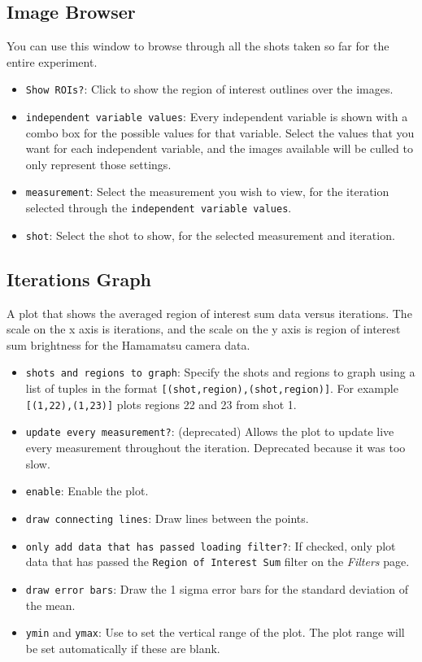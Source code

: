 \documentclass[pdftex,11pt,letterpaper]{article}
\begin{document}
\subsection{Image Browser}

You can use this window to browse through all the shots taken so far for the entire experiment.

\begin{itemize}
\item \texttt{Show ROIs?}: Click to show the region of interest outlines over the images.
\item \texttt{independent variable values}:  Every independent variable is shown with a combo box for the possible values for that variable.  Select the values that you want for each independent variable, and the images available will be culled to only represent those settings.
\item \texttt{measurement}:  Select the measurement you wish to view, for the iteration selected through the \texttt{independent variable values}.
\item \texttt{shot}:  Select the shot to show, for the selected measurement and iteration.
\end{itemize}

\subsection{Iterations Graph}

A plot that shows the averaged region of interest sum data versus iterations.  The scale on the x axis is iterations, and the scale on the y axis is region of interest sum brightness for the Hamamatsu camera data.

\begin{itemize}
\item \texttt{shots and regions to graph}:  Specify the shots and regions to graph using a list of tuples in the format \texttt{[(shot,region),(shot,region)]}.  For example \texttt{[(1,22),(1,23)]} plots regions 22 and 23 from shot 1.
\item \texttt{update every measurement?}:  (deprecated)  Allows the plot to update live every measurement throughout the iteration.  Deprecated because it was too slow.
\item \texttt{enable}:  Enable the plot.
\item \texttt{draw connecting lines}:  Draw lines between the points.
\item \texttt{only add data that has passed loading filter?}:  If checked, only plot data that has passed the \texttt{Region of Interest Sum} filter on the \textit{Filters} page.
\item \texttt{draw error bars}:  Draw the 1 sigma error bars for the standard deviation of the mean.
\item \texttt{ymin} and \texttt{ymax}:  Use to set the vertical range of the plot.  The plot range will be set automatically if these are blank.
\end{itemize}
\end{document}
